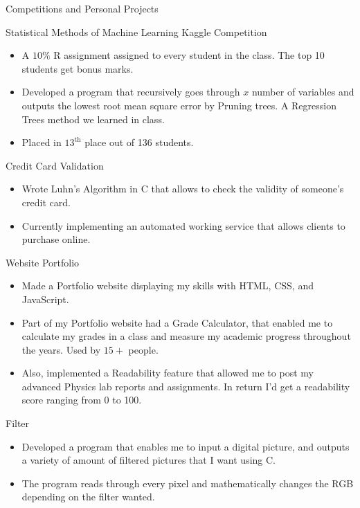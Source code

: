 \documentclass{article}
\newlength{\tabin}
\newlength{\secsep}
\newcommand{\lineunder}{\vspace*{-8pt} \\ \hspace*{-6pt} \hrulefill \\ \vspace*{-15pt}}
\newenvironment{tabbedsection}[1]{
  \begin{list}{}{
      \setlength{\itemsep}{0pt}
      \setlength{\labelsep}{0pt}
      \setlength{\labelwidth}{0pt}
      \setlength{\leftmargin}{\tabin}
      \setlength{\rightmargin}{\tabin}
      \setlength{\listparindent}{0pt}
      \setlength{\parsep}{0pt}
      \setlength{\parskip}{0pt}
      \setlength{\partopsep}{0pt}
      \setlength{\topsep}{#1}
    }
  \item[]
}{\end{list}}
\newenvironment{resume_section}[1]{
  \filbreak
  \vspace{2\secsep}
  \textsc{\large#1}
  \lineunder
  \begin{tabbedsection}{\secsep}
}{\end{tabbedsection}}
\newenvironment{resume_subsection}[2][]{
  \textbf{#2} \hfill {\footnotesize #1} \hspace{2em}
  \begin{tabbedsection}{0.5\secsep}
}{\end{tabbedsection}}
\newenvironment{subitems}{
  \renewcommand{\labelitemi}{-}
  \begin{itemize}
      \setlength{\labelsep}{1em}
}{\end{itemize}}
\begin{document}
\begin{resume_section}{Competitions and Personal Projects}
  \begin{resume_subsection}[(December 2021)]{Statistical Methods of Machine Learning Kaggle Competition}
  \begin{subitems}
    \item  A $10\%$ R assignment assigned to every student in the class. The top 10 students get bonus marks.
    \item Developed a program that recursively goes through $x$ number of variables and outputs the lowest root mean square error by Pruning trees. A Regression Trees method we learned in class.
    \item Placed in $13^{\text{th}}$ place out of 136 students.
    \end{subitems}
 \end{resume_subsection}


  \begin{resume_subsection}[(April 2021)]{Credit Card Validation}
  \begin{subitems}
    \item Wrote Luhn's Algorithm in C that allows to check the validity of someone's credit card.
    \item Currently implementing an automated working service that allows clients to purchase online.
    \end{subitems}
  \end{resume_subsection}



  \begin{resume_subsection}{Website Portfolio}
    \begin{subitems}
        \item Made a Portfolio website displaying my skills with HTML, CSS, and JavaScript.
        \item Part of my Portfolio website had a Grade Calculator, that enabled me to calculate my grades in a class and measure my academic progress throughout the years. Used by $15+$ people.
        \item Also, implemented a Readability feature that allowed me to post my advanced Physics lab reports and assignments. In return I'd get a readability score ranging from 0 to 100.
    \end{subitems}
  \end{resume_subsection}
  
  \begin{resume_subsection}[(May 2021)]{Filter}
    \begin{subitems}
    \item Developed a program that enables me to input a digital picture, and outputs a variety of amount of filtered pictures that I want using C.
    \item The program reads through every pixel and mathematically changes the RGB depending on the filter wanted.
    \end{subitems}
  \end{resume_subsection}
  

\end{resume_section}
\end{document}
